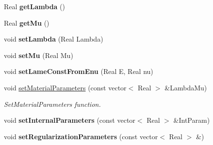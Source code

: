 \begin{DoxyCompactItemize}
\item 
\hypertarget{classvoom_1_1_comp_neo_hookean_a592eba176c601c9ef8a1d8f99662f61a}{
Real {\bfseries getLambda} ()}
\label{classvoom_1_1_comp_neo_hookean_a592eba176c601c9ef8a1d8f99662f61a}

\item 
\hypertarget{classvoom_1_1_comp_neo_hookean_ac7305702693599b3c4665033a265b138}{
Real {\bfseries getMu} ()}
\label{classvoom_1_1_comp_neo_hookean_ac7305702693599b3c4665033a265b138}

\item 
\hypertarget{classvoom_1_1_comp_neo_hookean_a02f7aec3fba76874e371c60c4d74a747}{
void {\bfseries setLambda} (Real Lambda)}
\label{classvoom_1_1_comp_neo_hookean_a02f7aec3fba76874e371c60c4d74a747}

\item 
\hypertarget{classvoom_1_1_comp_neo_hookean_a36ac89d490fb2e924eb5d5f9ed2fa20c}{
void {\bfseries setMu} (Real Mu)}
\label{classvoom_1_1_comp_neo_hookean_a36ac89d490fb2e924eb5d5f9ed2fa20c}

\item 
\hypertarget{classvoom_1_1_comp_neo_hookean_ab2adcdba7ac83ea746ab7e297b142ea1}{
void {\bfseries setLameConstFromEnu} (Real E, Real nu)}
\label{classvoom_1_1_comp_neo_hookean_ab2adcdba7ac83ea746ab7e297b142ea1}

\item 
\hypertarget{classvoom_1_1_comp_neo_hookean_adbd6b2e63c86293b5d50ad46e19da831}{
void \hyperlink{classvoom_1_1_comp_neo_hookean_adbd6b2e63c86293b5d50ad46e19da831}{setMaterialParameters} (const vector$<$ Real $>$ \&LambdaMu)}
\label{classvoom_1_1_comp_neo_hookean_adbd6b2e63c86293b5d50ad46e19da831}

\begin{DoxyCompactList}\small\item\em SetMaterialParameters function. \item\end{DoxyCompactList}\item 
\hypertarget{classvoom_1_1_comp_neo_hookean_af18d657120120deb44408befa69b4473}{
void {\bfseries setInternalParameters} (const vector$<$ Real $>$ \&IntParam)}
\label{classvoom_1_1_comp_neo_hookean_af18d657120120deb44408befa69b4473}

\item 
\hypertarget{classvoom_1_1_comp_neo_hookean_a59dffdab4e1b14beb4d6653ae4e31122}{
void {\bfseries setRegularizationParameters} (const vector$<$ Real $>$ \&)}
\label{classvoom_1_1_comp_neo_hookean_a59dffdab4e1b14beb4d6653ae4e31122}


\end{DoxyCompactItemize}
